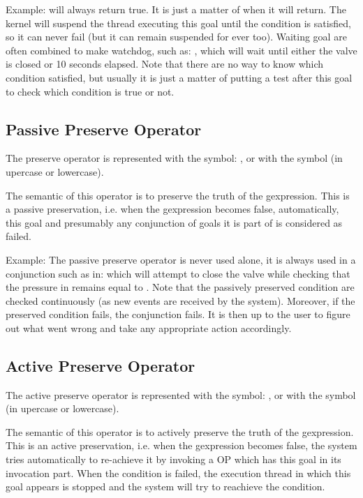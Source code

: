 Example:  will always return true. It is just
a matter of when it will return. The kernel will suspend the thread executing
this goal until the condition is satisfied, so it can never fail (but it can
remain suspended for ever too). Waiting goal are often combined to make
watchdog, such as: , which will wait until either the valve is closed or 10 seconds elapsed.
Note that there are no way to know which condition satisfied, but usually it is
just a matter of putting a test after this goal to check which condition is
true or not.

\subsection{Passive Preserve Operator}

The preserve operator is represented with the symbol: \samp{\#}, or with the
symbol  (in upercase or lowercase).

The semantic of this operator is to preserve the truth of the
gexpression. This is a passive preservation, i.e. when the gexpression
becomes false, automatically, this goal and presumably any conjunction of
goals it is part of is considered as failed.

Example: The passive preserve operator is never used alone, it is always used in a
conjunction such as in:  which will attempt to close the valve while checking that the pressure
in  remains equal to . Note that the passively preserved
condition are checked continuously (as new events are received by the system).
Moreover, if the preserved condition fails, the conjunction fails. It is then
up to the user to figure out what went wrong and take any appropriate action
accordingly.

\subsection{Active Preserve Operator}

The active preserve operator is represented with the symbol: \samp{\%}, or with the
symbol  (in upercase or lowercase).

The semantic of this operator is to actively preserve the truth of the
gexpression. This is an active preservation, i.e. when the gexpression
becomes false, the system tries automatically to re-achieve it by
invoking a OP which has this goal in its invocation part. When the condition is
failed, the execution thread in which this goal appears is stopped and the
system will try to reachieve the condition.

